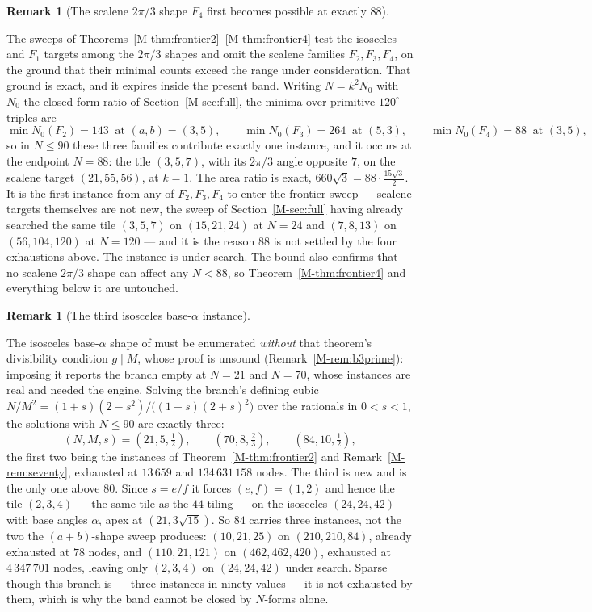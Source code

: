 \documentclass[11pt,reqno]{amsart}
\theoremstyle{plain}
\theoremstyle{definition}
\newtheorem{remark}[theorem]{Remark}
\begin{document}
\begin{remark}[The scalene $2\pi/3$ shape $F_4$ first becomes possible at exactly $88$]\label{OM-F4at88}

The sweeps of Theorems~\ref{M-thm:frontier2}--\ref{M-thm:frontier4} test the isosceles and $F_1$ targets
among the $2\pi/3$ shapes and omit the scalene families $F_2,F_3,F_4$, on the ground that their
minimal counts exceed the range under consideration. That ground is exact, and it expires inside the
present band. Writing $N=k^2N_0$ with $N_0$ the closed-form ratio of
Section~\ref{M-sec:full}, the minima over primitive $120^\circ$-triples are
\[
\min N_0(F_2)=143 \ \text{ at } (a,b)=(3,5), \qquad
\min N_0(F_3)=264 \ \text{ at } (5,3), \qquad
\min N_0(F_4)=88 \ \text{ at } (3,5),
\]
so in $N\le 90$ these three families contribute exactly one instance, and it occurs at the endpoint
$N=88$: the tile $(3,5,7)$, with its $2\pi/3$ angle opposite $7$, on the scalene target
$(21,55,56)$, at $k=1$. The area ratio is exact, $660\sqrt3 = 88\cdot\tfrac{15\sqrt3}{2}$. It is the
first instance from any of $F_2,F_3,F_4$ to enter the frontier sweep --- scalene targets themselves
are not new, the sweep of Section~\ref{M-sec:full} having already searched the same tile $(3,5,7)$ on
$(15,21,24)$ at $N=24$ and $(7,8,13)$ on $(56,104,120)$ at $N=120$ --- and it is the reason $88$ is
not settled by the four exhaustions above. The instance is under search. The bound also confirms
that no scalene $2\pi/3$ shape can affect any $N<88$, so Theorem~\ref{M-thm:frontier4} and everything
below it are untouched.
\end{remark}

\begin{remark}[The third isosceles base-$\alpha$ instance]\label{OM-isoalpha84}

The isosceles base-$\alpha$ shape of \cite[Thm.~19]{BeesonIII} must be enumerated \emph{without} that
theorem's divisibility condition $g\mid M$, whose proof is unsound (Remark~\ref{M-rem:b3prime}):
imposing it reports the branch empty at $N=21$ and $N=70$, whose instances are real and needed the
engine. Solving the branch's defining cubic
$N/M^2=(1+s)(2-s^2)/\bigl((1-s)(2+s)^2\bigr)$ over the rationals in $0<s<1$, the solutions with
$N\le 90$ are exactly three:
\[
(N,M,s)=(21,5,\tfrac12),\qquad (70,8,\tfrac23),\qquad (84,10,\tfrac12),
\]
the first two being the instances of Theorem~\ref{M-thm:frontier2} and Remark~\ref{M-rem:seventy},
exhausted at $13\,659$ and $134\,631\,158$ nodes. The third is new and is the only one above $80$.
Since $s=e/f$ it forces $(e,f)=(1,2)$ and hence the tile $(2,3,4)$ --- the same tile as the
$44$-tiling --- on the isosceles $(24,24,42)$ with base angles $\alpha$, apex at $(21,3\sqrt{15})$.
So $84$ carries three instances, not the two the $(a+b)$-shape sweep produces: $(10,21,25)$ on
$(210,210,84)$, already exhausted at $78$ nodes, and $(110,21,121)$ on $(462,462,420)$, exhausted at
$4\,347\,701$ nodes, leaving only $(2,3,4)$ on $(24,24,42)$ under search. Sparse though this branch is --- three instances in
ninety values --- it is not exhausted by them, which is why the band cannot be closed by $N$-forms
alone.
\end{remark}
\end{document}
